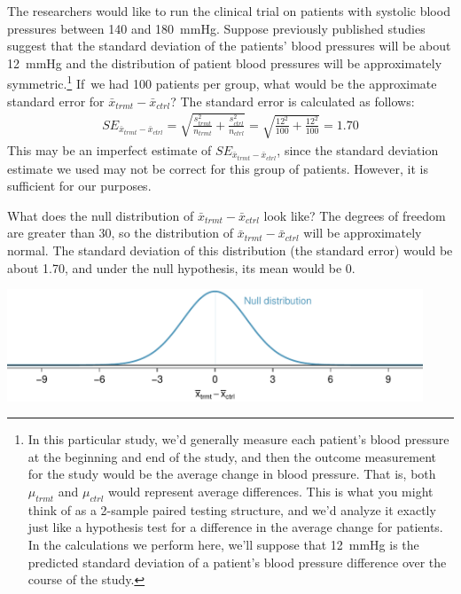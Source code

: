 \begin{example}{The researchers would like to run the clinical trial on patients with systolic blood pressures between 140 and 180~mmHg. Suppose previously published studies suggest that the standard deviation of the patients' blood pressures will be about 12~mmHg and the distribution of patient blood pressures will be approximately symmetric.\footnote{In this particular study, we'd generally measure each patient's blood pressure at the beginning and end of the study, and then the outcome measurement for the study would be the average change in blood pressure. That is, both $\mu_{trmt}$ and $\mu_{ctrl}$ would represent average differences. This is what you might think of as a 2-sample paired testing structure, and we'd analyze it exactly just like a hypothesis test for a difference in the average change for patients. In the calculations we perform here, we'll suppose that 12~mmHg is the predicted standard deviation of a patient's blood pressure difference over the course of the study.} If~we had 100 patients per group, what would be the approximate standard error for $\bar{x}_{trmt} - \bar{x}_{ctrl}$?}
The standard error is calculated as follows:
\begin{align*}
SE_{\bar{x}_{trmt} - \bar{x}_{ctrl}}
  = \sqrt{\frac{s_{trmt}^2}{n_{trmt}} + \frac{s_{ctrl}^2}{n_{ctrl}}}
  = \sqrt{\frac{12^2}{100} + \frac{12^2}{100}}
  = 1.70
\end{align*}
This may be an imperfect estimate of $SE_{\bar{x}_{trmt} - \bar{x}_{ctrl}}$, since the standard deviation estimate we used may not be correct for this group of patients. However, it is sufficient for our purposes.
\end{example}

\textC{\newpage}

\begin{example}{What does the null distribution of $\bar{x}_{trmt} - \bar{x}_{ctrl}$ look like?}
The degrees of freedom are greater than 30, so the distribution of $\bar{x}_{trmt} - \bar{x}_{ctrl}$ will be approximately normal. The standard deviation of this distribution (the standard error) would be about 1.70, and under the null hypothesis, its mean would be 0.
\begin{center}
\includegraphics[width=0.93\textwidth]{ch_inference_for_means/figures/power_null_0_1-7/power_null_A_0_1-7}
\end{center}
\end{example}

